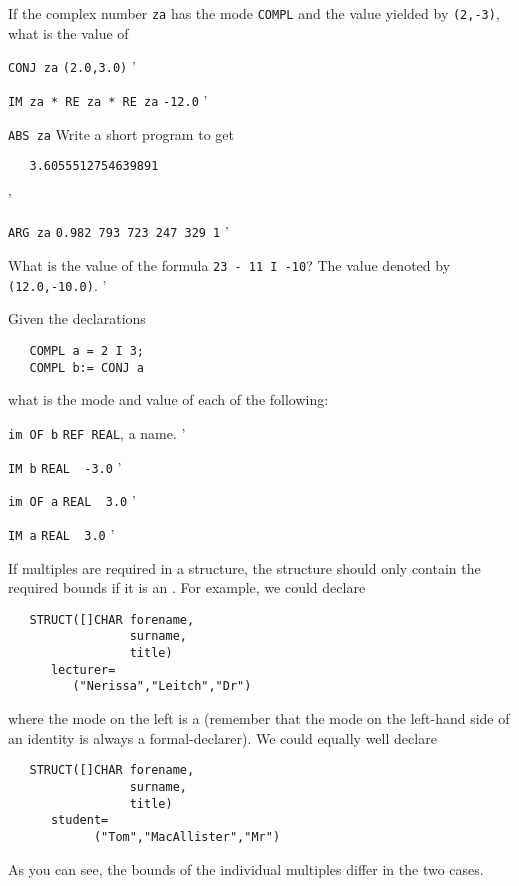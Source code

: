 \begin{exercise}
\item If the complex number \verb|za| has the mode \verb|COMPL| and the
value yielded by \verb|(2,-3)|, what is the value of
\begin{subex}
\item \verb|CONJ za| \subans \verb|(2.0,3.0)|
'
\item \verb|IM za * RE za * RE za| \subans \verb|-12.0|
'
\item \verb|ABS za| \subans Write a short program to get
\begin{verbatim}
   3.6055512754639891
\end{verbatim}
'
\item \verb|ARG za| \subans \verb|0.982 793 723 247 329 1|
'
\end{subex}
\item What is the value of the formula \verb|23 - 11 I -10|?
\ans The value denoted by \verb|(12.0,-10.0)|.
'
\item Given the declarations
\begin{verbatim}
   COMPL a = 2 I 3;
   COMPL b:= CONJ a
\end{verbatim}
\noindent
what is the mode and value of each of the following:
\begin{subex}
\item \verb|im OF b| \subans \verb|REF REAL|, a name.
'
\item \verb|IM b| \subans \verb|REAL  -3.0|
'
\item \verb|im OF a| \subans \verb|REAL  3.0|
'
\item \verb|IM a| \subans \verb|REAL  3.0|
'
\end{subex}
\end{exercise}

If multiples are required in a structure, the structure
 should only contain the
required bounds if it is an .  For example, we
could declare
\begin{verbatim}
   STRUCT([]CHAR forename,
                 surname,
                 title)
      lecturer=
         ("Nerissa","Leitch","Dr")
\end{verbatim}
\noindent
where the mode on the left is a  (remember that
the mode on the left-hand side of an identity
 is always a
formal-declarer).  We could equally well declare
\begin{verbatim}
   STRUCT([]CHAR forename,
                 surname,
                 title)
      student=
            ("Tom","MacAllister","Mr")
\end{verbatim}
\noindent
As you can see, the bounds of the individual multiples differ in the
two cases.

